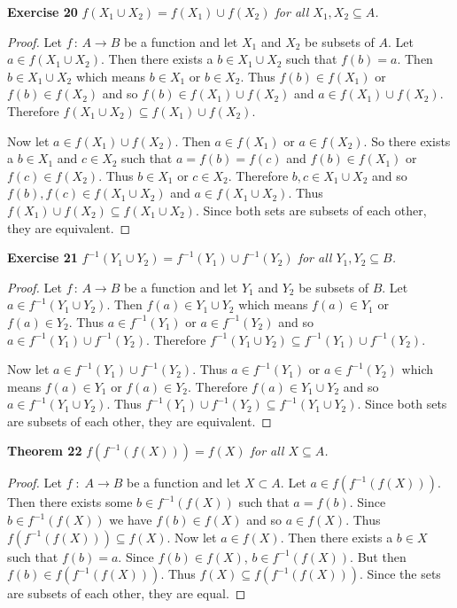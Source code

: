 \documentclass{article}
\begin{document}
\begin{flushleft}
\textbf{Exercise 20}
\textsl{$f (X_1 \cup X_2) = f(X_1) \cup f(X_2)$ for all $X_1, X_2 \subseteq A$.}
\begin{proof}
Let $f \, : \, A \rightarrow B$ be a function and let $X_1$ and $X_2$ be subsets of $A$. Let $a \in f (X_1 \cup X_2)$. Then there exists a $b \in X_1 \cup X_2$ such that $f(b)=a$. Then $b \in X_1 \cup X_2$ which means $b \in X_1$ or $b \in X_2$. Thus $f(b) \in f(X_1)$ or $f(b) \in f(X_2)$ and so $f(b) \in f(X_1) \cup f(X_2)$ and $a \in f(X_1) \cup f(X_2)$. Therefore $f (X_1 \cup X_2) \subseteq f(X_1) \cup f(X_2)$.\newline

Now let $a \in f(X_1) \cup f(X_2)$. Then $a \in f(X_1)$ or $a \in f(X_2)$. So there exists a $b \in X_1$ and $c \in X_2$ such that $a=f(b)=f(c)$ and $f(b) \in f(X_1)$ or $f(c) \in f(X_2)$. Thus $b \in X_1$ or $c \in X_2$. Therefore $b,c \in X_1 \cup X_2$ and so $f(b),f(c) \in f(X_1 \cup X_2)$ and $a \in f(X_1 \cup X_2)$. Thus $f(X_1) \cup f(X_2) \subseteq f(X_1 \cup X_2)$. Since both sets are subsets of each other, they are equivalent.
\end{proof}

\textbf{Exercise 21}
\textsl{$f^{-1} (Y_1 \cup Y_2) = f^{-1} (Y_1) \cup f^{-1} (Y_2)$ for all $Y_1, Y_2 \subseteq B$.}
\begin{proof}
Let $f \, : \, A \rightarrow B$ be a function and let $Y_1$ and $Y_2$ be subsets of $B$. Let $a \in f^{-1} (Y_1 \cup Y_2)$. Then $f(a) \in Y_1 \cup Y_2$ which means $f(a) \in Y_1$ or $f(a) \in Y_2$. Thus $a \in f^{-1} (Y_1)$ or $a \in f^{-1} (Y_2)$ and so $a \in f^{-1} (Y_1) \cup f^{-1} (Y_2)$. Therefore $f^{-1} (Y_1 \cup Y_2) \subseteq f^{-1} (Y_1) \cup f^{-1} (Y_2)$.\newline

Now let $a \in f^{-1} (Y_1) \cup f^{-1} (Y_2)$. Thus $a \in f^{-1} (Y_1)$ or $a \in f^{-1} (Y_2)$ which means $f(a) \in Y_1$ or $f(a) \in Y_2$. Therefore $f(a) \in Y_1 \cup Y_2$ and so $a \in f^{-1} (Y_1 \cup Y_2)$. Thus $f^{-1} (Y_1) \cup f^{-1} (Y_2) \subseteq f^{-1} (Y_1 \cup Y_2)$. Since both sets are subsets of each other, they are equivalent.
\end{proof}

\textbf{Theorem 22}
\textsl{$f(f^{-1}(f(X))) = f(X)$ for all $X \subseteq A$.}
\begin{proof}
Let $f \; : \; A \rightarrow B$ be a function and let $X \subset A$. Let $a \in f(f^{-1}(f(X)))$. Then there exists some $b \in f^{-1}(f(X))$ such that $a = f(b)$. Since $b \in f^{-1}(f(X))$ we have $f(b) \in f(X)$ and so $a \in f(X)$. Thus $f(f^{-1}(f(X))) \subseteq f(X)$. Now let $a \in f(X)$. Then there exists a $b \in X$ such that $f(b) = a$. Since $f(b) \in f(X)$, $b \in f^{-1}(f(X))$. But then $f(b) \in f(f^{-1}(f(X)))$. Thus $f(X) \subseteq f(f^{-1}(f(X)))$. Since the sets are subsets of each other, they are equal.
\end{proof}


\end{flushleft}
\end{document}
